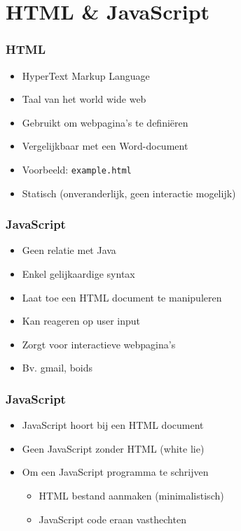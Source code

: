 \documentclass{../khlslides}
\begin{document}
\section{HTML \& JavaScript}

\frame{ \tableofcontents[currentsection] }

\begin{frame}
  \frametitle{HTML}
  \begin{itemize}
    \item HyperText Markup Language
          \vskip4mm
    \item Taal van het world wide web
          \vskip4mm
    \item Gebruikt om webpagina's te defini\"eren
          \vskip4mm
    \item Vergelijkbaar met een Word-document
          \vskip4mm
    \item Voorbeeld: {\tt example.html}
          \vskip4mm
    \item Statisch (onveranderlijk, geen interactie mogelijk)
  \end{itemize}
\end{frame}

\begin{frame}
  \frametitle{JavaScript}
  \begin{itemize}
    \item Geen relatie met Java
          \vskip4mm
    \item Enkel gelijkaardige syntax
          \vskip4mm
    \item Laat toe een HTML document te manipuleren
          \vskip4mm
    \item Kan reageren op user input
          \vskip4mm
    \item Zorgt voor interactieve webpagina's
          \vskip4mm
    \item Bv. gmail, boids
  \end{itemize}
\end{frame}

\begin{frame}
  \frametitle{JavaScript}
  \begin{itemize}
    \item JavaScript hoort bij een HTML document
          \vskip4mm
    \item Geen JavaScript zonder HTML {\tiny (white lie)}
          \vskip4mm
    \item Om een JavaScript programma te schrijven
          \begin{itemize}
            \item HTML bestand aanmaken (minimalistisch)
            \item JavaScript code eraan vasthechten
          \end{itemize}
  \end{itemize}
\end{frame}
\end{document}
